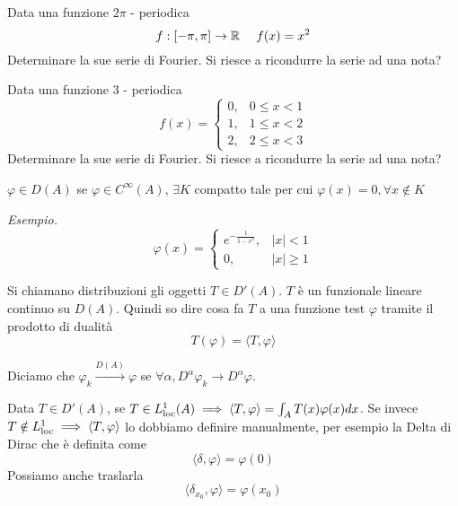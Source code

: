 Data una funzione $2\pi $ - periodica
\begin{equation*}
f:[ - \pi, \pi ]\rightarrow \mathbb{R}  \ \ \ \ f(x) = x^{2}
\end{equation*}
Determinare la sue serie di Fourier. Si riesce a ricondurre la serie ad una nota?
\Esercizio{}

Data una funzione $3$ - periodica
\begin{equation*}
f(x) = 
\begin{cases}
0, & 0 \leq x < 1\\
1, & 1 \leq x < 2\\
2, & 2 \leq x < 3
\end{cases}
\end{equation*}
Determinare la sue serie di Fourier. Si riesce a ricondurre la serie ad una nota?
\Esercizio{}
\begin{defn}
 $\varphi \in D(A)$ se $\varphi \in C^{\infty}(A)$, $\exists K$ compatto tale per cui $\varphi (x) = 0, \forall x\notin K$
\end{defn}
\textit{Esempio.}
\begin{equation*}
\varphi (x) = 
\begin{cases}
e^{- \frac{1}{1 - x^{2}}}, & | x| < 1\\
0, & | x| \geq 1
\end{cases}
\end{equation*}
\begin{defn}
[Distribuzione] Si chiamano distribuzioni gli oggetti $T\in D'(A)$. $T$ è un funzionale lineare continuo su $D(A)$. Quindi so dire cosa fa $T$ a una funzione test $\varphi $ tramite il prodotto di dualità
\begin{equation*}
T(\varphi) = \langle T, \varphi \rangle 
\end{equation*}
\end{defn}
\begin{defn}
 Diciamo che $\varphi_{k}\xrightarrow{D(A)} \varphi $ se $\forall \alpha, D^{\alpha} \varphi_{k}\rightarrow D^{\alpha} \varphi $.
\end{defn}
\begin{defn}
 Data $T\in D'(A)$, se $T\in L^{1}_{\operatorname{loc}}(A) \implies \langle T, \varphi \rangle = \int_{A} T(x) \varphi (x) dx$. Se invece $T\notin L^{1}_{\operatorname{loc}} \implies \langle T, \varphi \rangle $ lo dobbiamo definire manualmente, per esempio la Delta di Dirac che è definita come
\begin{equation*}
\langle \delta, \varphi \rangle = \varphi (0)
\end{equation*}
Possiamo anche traslarla
\begin{equation*}
\langle \delta_{x_{0}}, \varphi \rangle = \varphi (x_{0})
\end{equation*}
\end{defn}
